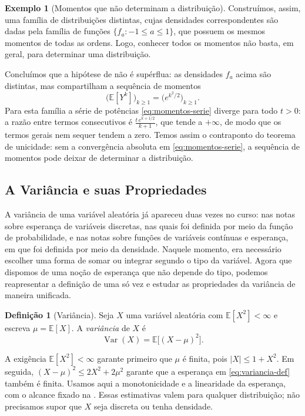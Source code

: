\documentclass[12pt,portuguese]{article}
\theoremstyle{definition}
\newtheorem{definition}[definition]{Definição}
\newtheorem{example}[example]{Exemplo}
\theoremstyle{plainexercise}
\theoremstyle{starredexercise}
\theoremstyle{definition}
\begin{document}
\begin{example}[Momentos que não determinam a distribuição]
Construímos, assim, uma família de distribuições distintas, cujas densidades correspondentes
são dadas pela família de funções $\{f_a:-1\leqslant a\leqslant 1\}$, que possuem os mesmos momentos de todas
as ordens. Logo, conhecer todos os momentos não basta, em geral, para
determinar uma distribuição.
\end{example}

Concluímos que a hipótese de  não é supérflua: as
densidades $f_a$ acima são distintas, mas compartilham a sequência de momentos
\[
\bigl(\mathbb{E}[Y^k]\bigr)_{k \geqslant 1}
= 
\bigl(e^{k^2/2}\bigr)_{k \geqslant 1}.
\]
Para esta família a série de potências 
\eqref{eq:momentos-serie} diverge para todo $t > 0$: a razão entre termos
consecutivos é $\frac{t\, e^{k + 1/2}}{k + 1}$, que tende a $+\infty$, de modo
que os termos gerais nem sequer tendem a zero. Temos assim o contraponto do
teorema de unicidade: sem a convergência absoluta em \eqref{eq:momentos-serie},
a sequência de momentos pode deixar de determinar a distribuição.

\subsection{A Variância e suas Propriedades}\label{subsec:variancia-propriedades}

A variância de uma variável aleatória já apareceu duas vezes no curso: nas notas
sobre esperança de variáveis discretas, nas quais foi definida por meio da função de
probabilidade, e nas notas sobre funções de variáveis contínuas e esperança,
em que foi definida por meio da densidade. Naquele momento, era necessário escolher
uma forma de somar ou integrar segundo o tipo da variável. Agora que dispomos de
uma noção de esperança que não depende do tipo, podemos reapresentar a definição
de uma só vez e estudar as propriedades da variância de maneira unificada.

\begin{definition}[Variância]\label{def:variancia}
Seja $X$ uma variável aleatória com $\mathbb{E}[X^2]<\infty$ e escreva
$\mu=\mathbb{E}[X]$. A \emph{variância} de $X$ é
\begin{equation}\label{eq:variancia-def}
\operatorname{Var}(X)=\mathbb{E}\bigl[(X-\mu)^2\bigr].
\end{equation}
\end{definition}

A exigência $\mathbb{E}[X^2]<\infty$ garante primeiro que $\mu$ é finita,
pois $|X|\leqslant1+X^2$. Em seguida,
$(X-\mu)^2\leqslant2X^2+2\mu^2$ garante que a esperança em
\eqref{eq:variancia-def} também é finita. Usamos aqui a monotonicidade e a
linearidade da esperança, com o alcance fixado na .
Essas estimativas valem para qualquer distribuição; não precisamos supor
que $X$ seja discreta ou tenha densidade.
\end{document}
